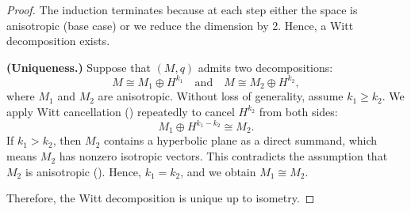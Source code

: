 \begin{proof}
    The induction terminates because at each step either the space is anisotropic (base case) or we reduce the dimension by 2. Hence, a Witt decomposition exists.

    \textbf{(Uniqueness.)} Suppose that $(M, q)$ admits two decompositions:
    $$M \cong M_1 \oplus H^{k_1} \quad \text{and} \quad M \cong M_2 \oplus H^{k_2},$$
    where $M_1$ and $M_2$ are anisotropic. Without loss of generality, assume $k_1 \geq k_2$. We apply Witt cancellation () repeatedly to cancel $H^{k_2}$ from both sides:
    $$M_1 \oplus H^{k_1 - k_2} \cong M_2.$$
    If $k_1 > k_2$, then $M_2$ contains a hyperbolic plane as a direct summand, which means $M_2$ has nonzero isotropic vectors. This contradicts the assumption that $M_2$ is anisotropic (). Hence, $k_1 = k_2$, and we obtain $M_1 \cong M_2$.

    Therefore, the Witt decomposition is unique up to isometry.
\end{proof}
